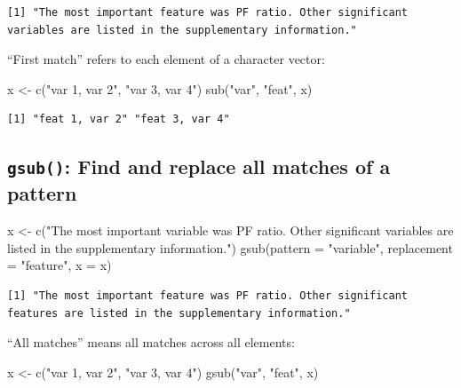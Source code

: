 \documentclass[
]{book}
\newenvironment{Shaded}{\begin{snugshade}}{\end{snugshade}}
\newcommand{\AttributeTok}[1]{\textcolor[rgb]{0.77,0.63,0.00}{#1}}
\newcommand{\FunctionTok}[1]{\textcolor[rgb]{0.00,0.00,0.00}{#1}}
\newcommand{\NormalTok}[1]{#1}
\newcommand{\OtherTok}[1]{\textcolor[rgb]{0.56,0.35,0.01}{#1}}
\newcommand{\StringTok}[1]{\textcolor[rgb]{0.31,0.60,0.02}{#1}}
\begin{document}
\begin{verbatim}
[1] "The most important feature was PF ratio. Other significant variables are listed in the supplementary information."
\end{verbatim}

``First match'' refers to each element of a character vector:

\begin{Shaded}
\begin{Highlighting}[]
\NormalTok{x }\OtherTok{\textless{}{-}} \FunctionTok{c}\NormalTok{(}\StringTok{"var 1, var 2"}\NormalTok{, }\StringTok{"var 3, var 4"}\NormalTok{)}
\FunctionTok{sub}\NormalTok{(}\StringTok{"var"}\NormalTok{, }\StringTok{"feat"}\NormalTok{, x)}
\end{Highlighting}
\end{Shaded}

\begin{verbatim}
[1] "feat 1, var 2" "feat 3, var 4"
\end{verbatim}

\hypertarget{gsub-find-and-replace-all-matches-of-a-pattern}{%
\subsection{\texorpdfstring{\texttt{gsub()}: Find and replace \textbf{all} matches of a pattern}{gsub(): Find and replace all matches of a pattern}}\label{gsub-find-and-replace-all-matches-of-a-pattern}}

\begin{Shaded}
\begin{Highlighting}[]
\NormalTok{x }\OtherTok{\textless{}{-}} \FunctionTok{c}\NormalTok{(}\StringTok{"The most important variable was PF ratio. Other significant variables are listed in the supplementary information."}\NormalTok{)}
\FunctionTok{gsub}\NormalTok{(}\AttributeTok{pattern =} \StringTok{"variable"}\NormalTok{, }\AttributeTok{replacement =} \StringTok{"feature"}\NormalTok{, }\AttributeTok{x =}\NormalTok{ x)}
\end{Highlighting}
\end{Shaded}

\begin{verbatim}
[1] "The most important feature was PF ratio. Other significant features are listed in the supplementary information."
\end{verbatim}

``All matches'' means all matches across all elements:

\begin{Shaded}
\begin{Highlighting}[]
\NormalTok{x }\OtherTok{\textless{}{-}} \FunctionTok{c}\NormalTok{(}\StringTok{"var 1, var 2"}\NormalTok{, }\StringTok{"var 3, var 4"}\NormalTok{)}
\FunctionTok{gsub}\NormalTok{(}\StringTok{"var"}\NormalTok{, }\StringTok{"feat"}\NormalTok{, x)}
\end{Highlighting}
\end{Shaded}
\end{document}
